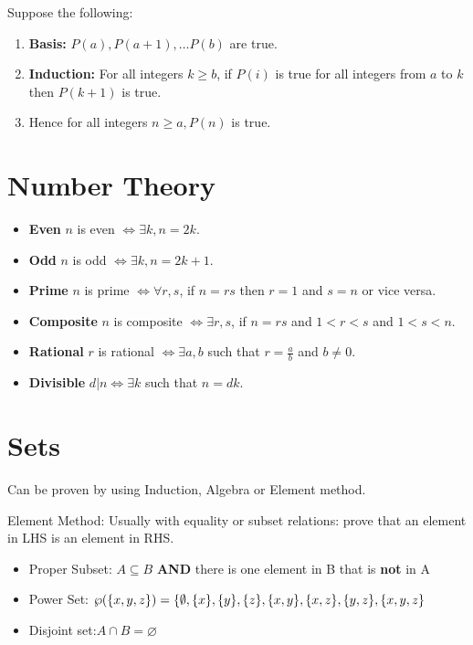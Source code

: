 \documentclass[landscape, letterpaper, 8pt]{extarticle}
\begin{document}
\begin{multicols}{3}
    Suppose the following:
    \begin{enumerate}
        \item \textbf{Basis:} $P(a), P(a+1), \ldots P(b)$ are true.
        \item \textbf{Induction:} For all integers $k\geq b$, if $P(i)$ is true for all integers from $a$ to $k$ then $P(k+1)$ is true.
        \item Hence for all integers $n\geq a, P(n)$ is true.
    \end{enumerate}
    \section*{Number Theory}
    \begin{itemize}[noitemsep,nolistsep]
        \item \textbf{Even} $n$ is even $\iff \exists k, n = 2k$.
        \item \textbf{Odd} $n$ is odd $\iff \exists k, n = 2k+1$.
        \item \textbf{Prime} $n$ is prime $\iff \forall r, s$, if $n = rs$ then $r=1$ and $s = n$ or vice versa.
        \item \textbf{Composite} $n$ is composite $\iff \exists r, s$, if $n = rs$ and $1 < r < s$ and $1 < s < n$.
        \item \textbf{Rational} $r$ is rational $\iff \exists a, b$ such that $r = \frac{a}{b}$ and $b \neq 0$.
        \item \textbf{Divisible} $d|n \iff \exists k$ such that $n=dk$.
    \end{itemize}
    \section*{Sets}
    Can be proven by using Induction, Algebra or Element method.

    Element Method: Usually with equality or subset relations: prove that an element in LHS is an element in RHS.
    \begin{itemize}[noitemsep,nolistsep]
        \item Proper Subset: $A \subseteq B$ \textbf{AND} there is one element in B that is \textbf{not} in A
        \item Power Set: $\wp(\{x, y, z\}) = \{\emptyset, \{x\}, \{y\}, \{z\},\\
                  \{x, y\},\{x, z\}, \{y, z\}, \{x, y, z\}$
        \item Disjoint set:$A\cap B = \varnothing$
    \end{itemize}

\end{multicols}
\end{document}
